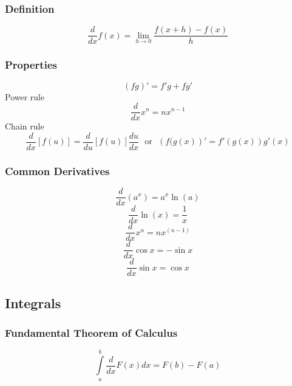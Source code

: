 \documentclass{article}
\begin{document}
		\subsubsection{Definition}
			\begin{equation}
				\frac{d}{{dx}}f\left( x \right) = \mathop {\lim }\limits_{h \to 0} \frac{{f\left( {x + h } \right) - f\left( x \right)}}{h }
			\end{equation}
		\subsubsection{Properties}
			\begin{equation}
				\left(fg\right)'=f'g+fg'
			\end{equation}
			Power rule
			\begin{equation}
				\frac{d}{dx}x^n = nx^{n-1}
			\end{equation}
			Chain rule
			\begin{equation}
				\frac{d}{{dx}}\left[ {f\left( u \right)} \right] = \frac{d}{{du}}\left[ {f\left( u \right)} \right]\frac{{du}}{{dx}} \ \ \ \mbox{or} \ \ \ \left(f(g(x)\right)'=f'\left(g(x)\right)g'(x)
			\end{equation}
		\subsubsection{Common Derivatives}
			\begin{equation}
				\frac{d}{{dx}}\left(a^x\right)=a^x\ln(a)
			\end{equation}
			\begin{equation}
				\frac{d}{{dx}}\ln \left( x \right) = \frac{1}{x}
			\end{equation}
			\begin{equation}
				\frac{d}{{dx}}x^n = nx^{\left( {n - 1} \right)}
			\end{equation}
			\begin{equation}
				\frac{d}{{dx}}\cos x = -\sin x
			\end{equation}
			\begin{equation}
				\frac{d}{{dx}}\sin x = \cos x
			\end{equation}
	\subsection{Integrals}
		\subsubsection{Fundamental Theorem of Calculus}
			\begin{equation}
			\int\limits_a^b {\frac{d}{{dx}}F\left( x \right)dx} = F\left( b \right) - F\left( a \right)
			\end{equation}
\end{document}
